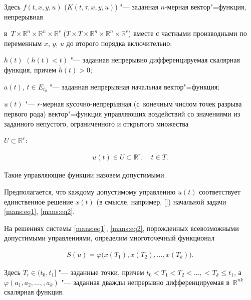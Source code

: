 Здесь  $ f(t,x,y,u) $ ($ K(t,\tau, x,y,u) $)  "--- заданная  $ n $-мерная вектор"=функция, непрерывная 

в~$ T\times  \mathbb  R^{n} \times \mathbb  R^{n} \times \mathbb  R^{r}$  ($T\times T\times  \mathbb  R^{n} \times \mathbb  R^{n} \times \mathbb  R^{r}  $)   вместе с частными производными по переменным $ x$, $ y$, $u $  до второго порядка включительно; 

$ h(t) $    $ (h(t)<t) $ "--- заданная непрерывно дифференцируемая скалярная функция, причем   $ \dot{h}(t)>0 $;  

$ a(t) $, $ t\in E_{t_{0}} $  "--- заданная непрерывная начальная вектор"=функция; 

$ u(t) $  "---  $ r $-мерная кусочно-непрерывная (с~конечным числом точек разрыва первого рода) вектор"=функция управляющих воздействий со значениями из заданного непустого, ограниченного и открытого множества  

$ U\subset \mathbb  R^{r} $:

\begin{gather}

u(t)\in U\subset \mathbb R^{r}, \quad  t\in T .

\label{mans:eq3}

\end{gather}



Такие управляющие функции назовем допустимыми.



Предполагается, что каждому допустимому управлению $ u(t) $  соответствует единственное решение $ x(t) $  (в смысле, например, []) начальной задачи \eqref{mans:eq1}, \eqref{mans:eq2}.



На решениях системы \eqref{mans:eq1}, \eqref{mans:eq2}, порожденных всевозможными допустимыми управлениями, определим многоточечный функционал

\begin{gather}

S(u)=\varphi \bigl(x(T_{1}), x(T_{2}), \ldots, x(T_{k})\bigr) .

\label{mans:eq4}

\end{gather}

Здесь  $ T_{i}\in ( t_{0}, t_{1} ]  $   "--- заданные точки, причем  $ {t_{0}< T_{1}<T_{2}<\ldots, <T_{k}\leq t_{1} }$, а  $ \varphi (a_{1}, a_{2}, \ldots, , a_{k}) $ "--- заданная дважды непрерывно дифференцируемая в~$ \mathbb R^{nk} $  скалярная функция.



